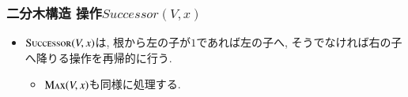 \documentclass[main]{subfiles}
\begin{document}
\begin{frame}\frametitle{二分木構造 操作$Successor(V,x)$}
\begin{itemize}
\item $\mathrm{\text{S\textsc{uccessor}}}(V,x)$は, 根から左の子が$1$であれば左の子へ, そうでなければ右の子へ降りる操作を再帰的に行う.
\begin{itemize}
	\item $\mathrm{\text{M\textsc{ax}}}(V,x)$も同様に処理する.
\end{itemize}
\end{itemize}


\end{frame}
\end{document}
